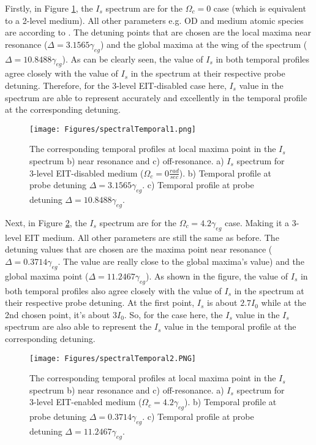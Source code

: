 Firstly, in Figure \ref{fig: corresponding temporal profile 1}, the $I_{s}$ spectrum are for the $\Omega_{c} = 0$ case (which is equivalent to a 2-level medium). All other parameters e.g. OD and medium atomic species are according to \cite{jeong2010slow}. The detuning points that are chosen are the local maxima near resonance ($\Delta = 3.1565\gamma_{eg}$) and the global maxima at the wing of the spectrum ($\Delta = 10.8488\gamma_{eg}$). As can be clearly seen, the value of $I_{s}$ in both temporal profiles agree closely with the value of $I_{s}$ in the spectrum at their respective probe detuning. Therefore, for the 3-level EIT-disabled case here, $I_{s}$ value in the spectrum are able to represent accurately and excellently in the temporal profile at the corresponding detuning.

\begin{figure}
    \centering
    \texttt{[image: Figures/spectralTemporal1.png]}
    \caption{The corresponding temporal profiles at local maxima point in the $I_{s}$ spectrum b) near resonance and c) off-resonance. a) $I_{s}$ spectrum for 3-level EIT-disabled medium ($\Omega_{c} = 0 \frac{rad}{sec}$). b)  Temporal profile at probe detuning $\Delta = 3.1565\gamma_{eg}$. c) Temporal profile at probe detuning $\Delta = 10.8488\gamma_{eg}$.}
    \label{fig: corresponding temporal profile 1}
\end{figure}

Next, in Figure \ref{fig: corresponding temporal profile 2}, the $I_{s}$ spectrum are for the $\Omega_{c} = 4.2\gamma_{eg}$ case. Making it a 3-level EIT medium. All other parameters are still the same as before. The detuning values that are chosen are the maxima point near resonance ($\Delta = 0.3714\gamma_{eg}$. The value are really close to the global maxima's value) and the global maxima point ($\Delta = 11.2467\gamma_{eg}$). As shown in the figure, the value of $I_{s}$ in both temporal profiles also agree closely with the value of $I_{s}$ in the spectrum at their respective probe detuning. At the first point, $I_{s}$ is about $2.7I_{0}$ while at the 2nd chosen point, it's about $3I_{0}$. So, for the case here, the $I_{s}$ value in the $I_{s}$ spectrum are also able to represent the $I_{s}$ value in the temporal profile at the corresponding detuning.

\begin{figure}
    \centering
     \texttt{[image: Figures/spectralTemporal2.PNG]}
    \caption{The corresponding temporal profiles at local maxima point in the $I_{s}$ spectrum b) near resonance and c) off-resonance. a) $I_{s}$ spectrum for 3-level EIT-enabled medium ($\Omega_{c} = 4.2\gamma_{eg}$). b) Temporal profile at probe detuning $\Delta = 0.3714\gamma_{eg}$. c) Temporal profile at probe detuning $\Delta = 11.2467\gamma_{eg}$.}
    \label{fig: corresponding temporal profile 2}
\end{figure}

